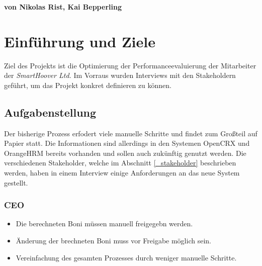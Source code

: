 \documentclass[]{article}
\def\autor{Nikolas Rist, Kai Bepperling}
\def\datum{20.~September 2019}
\begin{document}
\begin{titlepage}
\begin{center}
		\vspace{0.7cm}
		\begin{Large}\textbf{von \autor\ \\}
		\end{Large}
	\end{center}
	
	\vspace{2cm}
	
\end{titlepage}

\tableofcontents
\cleardoublepage

\hypertarget{section-introduction-and-goals}{%
\section{Einführung und Ziele}\label{section-introduction-and-goals}}
Ziel des Projekts ist die Optimierung der Performanceevaluierung der Mitarbeiter der \emph{SmartHoover Ltd.} Im Vorraus wurden Interviews mit den Stakeholdern geführt, um das Projekt konkret definieren zu können. 

\hypertarget{_aufgabenstellung}{%
\subsection{Aufgabenstellung}\label{_aufgabenstellung}}

Der bisherige Prozess erfodert viele manuelle Schritte und findet zum Großteil auf Papier statt. Die Informationen sind allerdings in den Systemen OpenCRX und OrangeHRM bereits vorhanden und sollen auch zukünftig genutzt werden. 
Die verschiedenen Stakeholder, welche im Abschnitt \ref{_stakeholder} beschrieben werden, haben in einem Interview einige Anforderungen an das neue System gestellt.
\subsubsection{CEO}
\begin{itemize}
\item Die berechneten Boni müssen manuell freigegebn werden.
\item Änderung der brechneten Boni muss vor Freigabe möglich sein.
\item Vereinfachung des gesamten Prozesses durch weniger manuelle Schritte.
\end{itemize}
\end{document}
